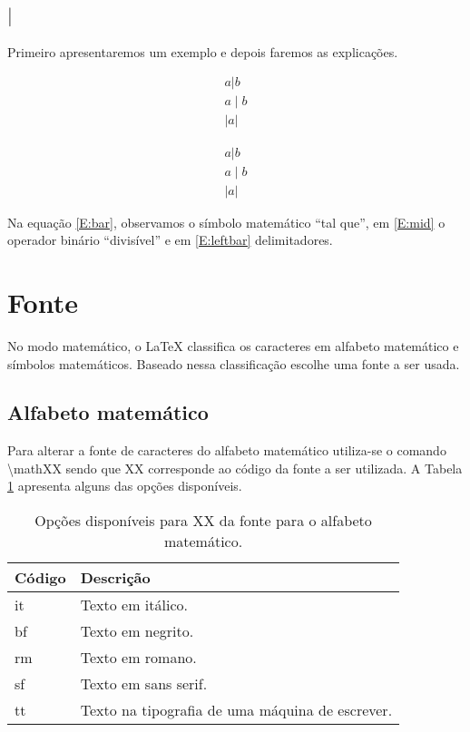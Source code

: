 \subsection{$|$}
Primeiro apresentaremos um exemplo e depois faremos as explicações. \\
\begin{minipage}[t]{0.47\linewidth} \vspace{-8pt}
    \begin{latexcode}
        \begin{align}
            a|b \label{E:bar} \\
            a \mid b \label{E:mid} \\
            \left| a \right| \label{E:leftbar}
        \end{align}
    \end{latexcode}
\end{minipage} \hfill
\begin{minipage}[t]{0.47\linewidth}
    \vspace{0pt}
    \begin{align}
        a|b \label{E:bar} \\
        a \mid b \label{E:mid} \\
        \left| a \right| \label{E:leftbar}
    \end{align}
\end{minipage}

Na equação \ref{E:bar}, observamos o símbolo matemático ``tal que'', em \ref{E:mid} o operador binário ``divisível'' e em \ref{E:leftbar} delimitadores.

\section{Fonte}
No modo matemático, o LaTeX classifica os caracteres em alfabeto matemático e símbolos matemáticos. Baseado nessa classificação escolhe uma fonte a ser usada.

\subsection{Alfabeto matemático}
Para alterar a fonte de caracteres do alfabeto matemático utiliza-se o comando \textsf{\textbackslash mathXX} sendo que \textsf{XX} corresponde ao código da fonte a ser utilizada. A Tabela \ref{tab:op_amfonte} apresenta alguns das opções disponíveis.
\begin{table}[h!tb]
    \centering
    \caption{Opções disponíveis para \textsf{XX} da fonte para o alfabeto matemático.}
    \label{tab:op_amfonte}
    \begin{tabular}{lp{}}
        \hline
        Código & Descrição \\ \hline
        \textsf{it} & Texto em itálico. \\
        \textsf{bf} & Texto em negrito. \\
        \textsf{rm} & Texto em romano. \\
        \textsf{sf} & Texto em sans serif. \\
        \textsf{tt} & Texto na tipografia de uma máquina de escrever.
    \end{tabular}
\end{table}

